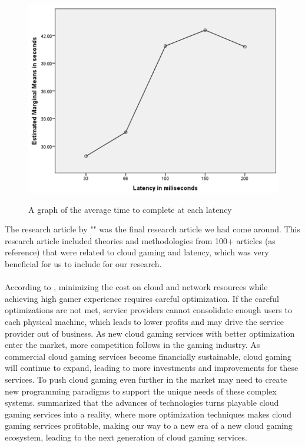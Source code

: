 \begin{figure}[H]
	\centering
	\includegraphics[width=12cm]{../img/fig25.png}
	\caption{A graph of the average time to complete at each latency}
	\parencite[Section 4.1, Page 15, Figure 4.1]{claypool2014effects}
\end{figure}
\newpage
The research article  by "\citeauthor{7536162}" was the final research article we had come around. This research article included theories and methodologies from 100+ articles (as reference) that were related to cloud gaming and latency, which was very beneficial for us to include for our research.\\\\
According to \textcite[Chapter VI]{7536162}, minimizing the cost on cloud and network resources while achieving high gamer experience requires careful optimization. If the careful optimizations are not met, service providers cannot consolidate enough users to each physical machine, which leads to lower profits and may drive the service provider out of business. As new cloud gaming services with better optimization enter the market, more competition follows in the gaming industry. As commercial cloud gaming services become financially sustainable, cloud gaming will continue to expand, leading to more investments and improvements for these services. To push cloud gaming even further in the market may need to create new programming paradigms to support the unique needs of these complex systems. \textcite[Chapter VI]{7536162} summarized that the advances of technologies turns playable cloud gaming services into a reality, where more optimization techniques makes cloud gaming services profitable, making our way to a new era of a new cloud gaming ecosystem, leading to the next generation of cloud gaming services.